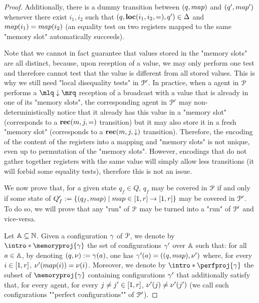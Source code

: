 \begin{proof}
	Additionally, there is a dummy transition between $(q,\map)$ and $(q',\map')$ whenever there exist $i_1, i_2$ such that $(q, \textbf{loc}(i_1,i_2,{=}), q') \in \Delta$ and $\map(i_1) = \map(i_2)$ (an equality test on two registers mapped to the same "memory slot" automatically succeeds).

	Note that we cannot in fact guarantee that values stored in the "memory slots" are all distinct, because, upon reception of a value, we may only perform one test and therefore cannot test that the value is different from all stored values. This is why we still need "local disequality tests" in $\mathcal{P}'$. In practice, when a agent in $\mathcal{P}$ performs a $\quotemarks{\enregact}$ reception of a broadcast with a value that is already in one of its "memory slots", the corresponding agent in $\mathcal{P}'$ may non-deterministically notice that it already has this value in a "memory slot" (corresponds to a $\textbf{rec}(m, j, {=})$ transition) but it may also store it in a fresh "memory slot" (corresponds to a $\textbf{rec}(m, j, \downarrow)$ transition). Therefore, the encoding of the content of the registers into a mapping and "memory slots" is not unique, even up to permutation of the "memory slots". However, encodings that do not gather together registers with the same value will simply allow less transitions (it will forbid some equality tests), therefore this is not an issue. 

	We now prove that, for a given state $q_f \in Q$, $q_f$ may be covered in $\mathcal{P}$ if and only if some state of $Q_f' := \set{(q_f, \map) \mid \map \in \nset{1}{r} \to \nset{1}{r}}$ may be covered in $\mathcal{P}'$. To do so, we will prove that any "run" of $\mathcal{P}$ may be turned into a "run" of $\mathcal{P}'$ and vice-versa. 
  
	Let $\mathbb{A} \subseteq \mathbb{N}$.
	Given a configuration $\gamma$ of $\mathcal{P}$, we denote by \AP $\intro*\memoryproj{\config}$ 
	the set of configurations $\gamma'$ over $\mathbb{A}$ such that:
	 for all $a \in \mathbb{A}$, by denoting $(q, \nu):= \gamma(a)$, one has $\config'(a) = ((q, \map), \localdata')$ where, for every $i \in [1,r]$, $\localdata'(\map(i)) = \localdata(i)$. 
	Moreover, we denote by $\intro*\perfproj{\config}$ 
	the subset of $\memoryproj{\config}$ containing configurations 
	$\gamma'$ that additionally satisfy that, for every agent, for every $j \ne j' \in [1,r]$, $\nu'(j) \ne \nu'(j')$ (we call such configurations ""perfect configurations"" of $\mathcal{P}'$).


\end{proof}
